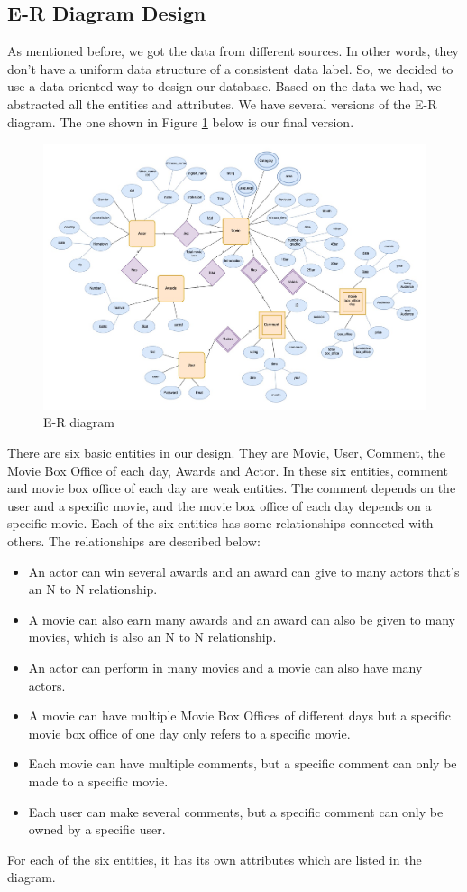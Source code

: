 \documentclass[a4paper]{article}
\begin{document}
  \subsection{E-R Diagram Design}
As mentioned before, we got the data from different sources. In other words, they don't have a uniform data structure of a consistent data label. So, we decided to use a data-oriented way to design our database. Based on the data we had, we abstracted all the entities and attributes. We have several versions of the E-R diagram. The one shown in Figure \ref{fig:er} below is our final version. \par
  \begin{figure}[ht]
    \centering
    \includegraphics[width=\textwidth]{figures/er.jpeg}
    \caption{E-R diagram}
    \label{fig:er}
  \end{figure}
There are six basic entities in our design. They are Movie, User, Comment, the Movie Box Office of each day, Awards and Actor. In these six entities, comment and movie box office of each day are weak entities. The comment depends on the user and a specific movie, and the movie box office of each day depends on a specific movie. Each of the six entities has some relationships connected with others. The relationships are described below:
    \begin{itemize}
      \item An actor can win several awards and an award can give to many actors that's an N to N relationship.
      \item A movie can also earn many awards and an award can also be given to many movies, which is also an N to N relationship.
      \item An actor can perform in many movies and a movie can also have many actors.
      \item A movie can have multiple Movie Box Offices of different days but a specific movie box office of one day only refers to a specific movie.
      \item Each movie can have multiple comments, but a specific comment can only be made to a specific movie.
      \item Each user can make several comments, but a specific comment can only be owned by a specific user.
    \end{itemize}
For each of the six entities, it has its own attributes which are listed in the diagram.
\end{document}
